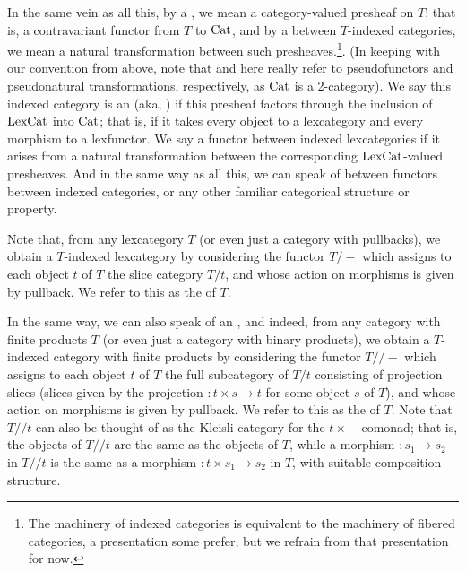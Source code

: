 In the same vein as all this, by a , we mean a category-valued presheaf on $T$; that is, a contravariant functor from $T$ to $\mathrm{Cat}$, and by a  between $T$-indexed categories, we mean a natural transformation between such presheaves.\footnote{The machinery of indexed categories is equivalent to the machinery of fibered categories, a presentation some prefer, but we refrain from that presentation for now.}. (In keeping with our convention from above, note that  and  here really refer to pseudofunctors and pseudonatural transformations, respectively, as $\mathrm{Cat}$ is a 2-category). We say this indexed category is an  (aka, ) if this presheaf factors through the inclusion of $\mathrm{LexCat}$ into $\mathrm{Cat}$; that is, if it takes every object to a lexcategory and every morphism to a lexfunctor. We say a functor between indexed lexcategories  if it arises from a natural transformation between the corresponding $\mathrm{LexCat}$-valued presheaves. And in the same way as all this, we can speak of  between functors between indexed categories, or any other familiar categorical structure or property.

Note that, from any lexcategory $T$ (or even just a category with pullbacks), we obtain a $T$-indexed lexcategory by considering the functor $T/-$ which assigns to each object $t$ of $T$ the slice category $T/t$, and whose action on morphisms is given by pullback. We refer to this as the  of $T$.

In the same way, we can also speak of an , and indeed, from any category with finite products $T$ (or even just a category with binary products), we obtain a $T$-indexed category with finite products by considering the functor $T//-$ which assigns to each object $t$ of $T$ the full subcategory of $T/t$ consisting of projection slices (slices given by the projection $: t \times s \to t$ for some object $s$ of $T$), and whose action on morphisms is given by pullback. We refer to this as the  of $T$. Note that $T//t$ can also be thought of as the Kleisli category for the $t \times -$ comonad; that is, the objects of $T//t$ are the same as the objects of $T$, while a morphism $: s_1 \to s_2$ in $T//t$ is the same as a morphism $: t \times s_1 \to s_2$ in $T$, with suitable composition structure.

